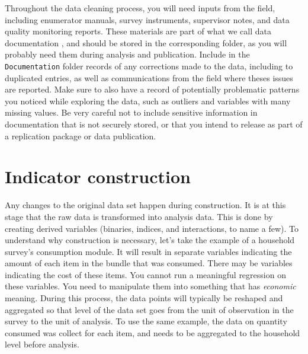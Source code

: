 Throughout the data cleaning process, you will need inputs from the field, 
including enumerator manuals, survey instruments, 
supervisor notes, and data quality monitoring reports.
These materials are part of what we call data documentation
,
and should be stored in the corresponding folder, 
as you will probably need them during analysis and publication.
Include in the \texttt{Documentation} folder records of any
corrections made to the data, including to duplicated entries,
as well as communications from the field where theses issues are reported.
Make sure to also have a record of potentially problematic patterns you noticed
while exploring the data, such as outliers and variables with many missing values.
Be very careful not to include sensitive information in 
documentation that is not securely stored, 
or that you intend to release as part of a replication package or data publication.

\section{Indicator construction}

Any changes to the original data set happen during construction.
It is at this stage that the raw data is transformed into analysis data.
This is done by creating derived variables
(binaries, indices, and interactions, to name a few).
To understand why construction is necessary,
let's take the example of a household survey's consumption module.
It will result in separate variables indicating the 
amount of each item in the bundle that was consumed.
There may be variables indicating the cost of these items.
You cannot run a meaningful regression on these variables. 
You need to manipulate them into something that has \textit{economic} meaning. 
During this process, the data points will typically be reshaped and aggregated 
so that level of the data set goes from the unit of observation in the survey to the unit of analysis. 
To use the same example, the data on quantity consumed was collect for each item, and needs to be aggregated to the household level before analysis.


